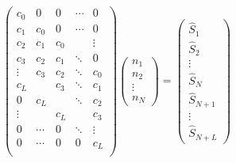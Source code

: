 \documentclass[12pt]{article}
\begin{document}
	\begin{equation}
		\begin{pmatrix} 
			c_0   &  0   &  0   &\dotsm&   0     \\
			c_1   & c_0  &  0   &\dotsm&  0     \\
			c_2   & c_1  & c_0  &      & \vdots \\
			c_3   & c_2  & c_1  &\ddots&  0     \\
     	    \vdots& c_3  & c_2  &\ddots&  c_0   \\
			c_L   &      & c_3  &\ddots&  c_1   \\
			0     & c_L  &      &\ddots&  c_2   \\
			\vdots&      & c_L  &      &  c_3   \\
			0     &\dotsm&  0   &\ddots& \vdots \\
			0     &\dotsm& 0    &   0  &  c_L   \\
		\end{pmatrix}
		\begin{pmatrix} 
			n_1 \\ n_2 \\ \vdots \\ n_N
		\end{pmatrix}
		=
		\begin{pmatrix} 
			\hat{S}_1 \\ \hat{S}_2 \\ \vdots \\
			\hat{S}_N \\
			\hat{S}_{N+1} \\ \vdots \\ \hat{S}_{N+L}
		\end{pmatrix}
	\end{equation}
	
\end{document}
